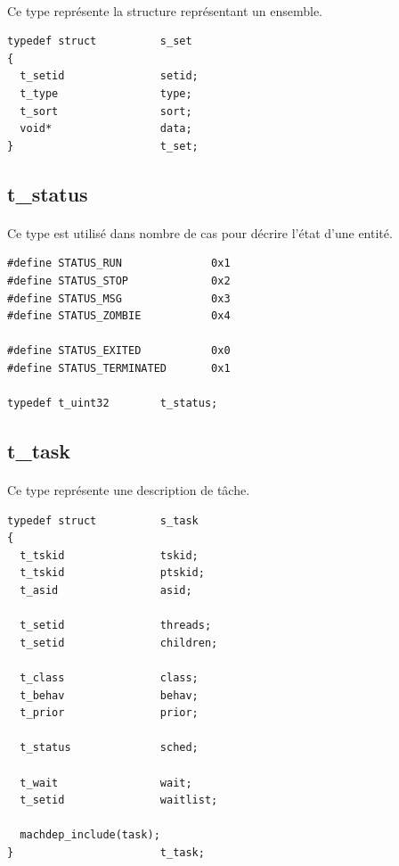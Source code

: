 \documentclass[10pt,a4wide]{article}
\begin{document}
\paragraph{}

Ce type repr\'esente la structure repr\'esentant un ensemble.

\begin{verbatim}
typedef struct          s_set
{
  t_setid               setid;
  t_type                type;
  t_sort                sort;
  void*                 data;
}                       t_set;
\end{verbatim}

\subsection{t\_status}

\paragraph{}

Ce type est utilis\'e dans nombre de cas pour d\'ecrire l'\'etat
d'une entit\'e.

\begin{verbatim}
#define STATUS_RUN              0x1
#define STATUS_STOP             0x2
#define STATUS_MSG              0x3
#define STATUS_ZOMBIE           0x4

#define STATUS_EXITED           0x0
#define STATUS_TERMINATED       0x1

typedef t_uint32        t_status;
\end{verbatim}

\subsection{t\_task}

\paragraph{}

Ce type repr\'esente une description de t\^ache.

\begin{verbatim}
typedef struct          s_task
{
  t_tskid               tskid;
  t_tskid               ptskid;
  t_asid                asid;

  t_setid               threads;
  t_setid               children;

  t_class               class;
  t_behav               behav;
  t_prior               prior;

  t_status              sched;

  t_wait                wait;
  t_setid               waitlist;

  machdep_include(task);
}                       t_task;
\end{verbatim}
\end{document}
